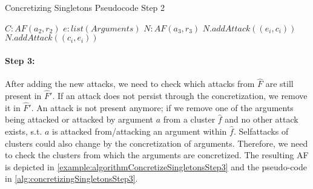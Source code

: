 \begin{algorithm}[H]
    \caption{Concretizing Singletons Pseudocode Step 2}\label{alg:concretizingSingletonsStep2}
    \begin{algorithmic}[1]
        \Require $C: AF(a_2, r_2)$ 
        \Require $e: list(Arguments)$ 
        \Require $N: AF(a_3, r_3)$ 
                    \State $N.addAttack((e_i, c_i))$
                \EndIf
            \EndFor
                    \State $N.addAttack((c_i, e_i))$
                \EndIf
            \EndFor
        \EndFor
    \end{algorithmic}
\end{algorithm}



\paragraph{Step 3:} After adding the new attacks, we need to check which attacks from $\hat{F}$ are still present in $\hat{F}'$. If an attack does not persist through the concretization, we remove it in $\hat{F}'$. An attack is not present anymore; if we remove one of the arguments being attacked or attacked by argument $a$ from a cluster $\hat{f}$ and no other attack exists, s.t. $a$ is attacked from/attacking an argument within $\hat{f}$. Selfattacks of clusters could also change by the concretization of arguments. Therefore, we need to check the clusters from which the arguments are concretized. The resulting AF is depicted in \cref{example:algorithmConcretizeSingletonsStep3} and the pseudo-code in \cref{alg:concretizingSingletonsStep3}.


